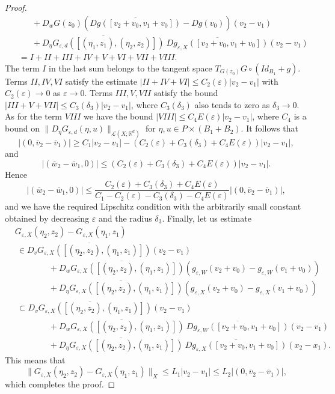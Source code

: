 \documentclass[10pt,a4paper]{amsart}
\def\R{\mathbb{R}}
\begin{document}
\begin{proof}
\begin{align*}
	 				& \qquad +D_wG(z_0)\left(\overline{Dg([v_2+v_0,v_1+v_0])}-Dg(v_0)\right)(v_2-v_1)\\
	 				& \qquad  + \overline{D_\eta G_{\varepsilon,d}([(\eta_1,z_1),(\eta_2,z_2)])}\ \overline{D g_{\varepsilon,X}([v_2+v_0,v_1+v_0])} (v_2-v_1) \\
	 				& \ \ = I + II+III+IV+V+VI+VII+VIII.
	 			\end{align*}
	 			The  term $I$ in the last sum belongs to the tangent space $T_{G(z_0)}G\circ(Id_{B_1}+g)$. Terms $II, IV, VI$ satisfy the estimate $|II+IV+VI|\leq C_2(\varepsilon)|v_2-v_1|$ with $C_2(\varepsilon)\to 0$ as $\varepsilon\to 0$. Terms $III,V,VII$ satisfy the bound $|III+V+VII|\leq C_3(\delta_3)|v_2-v_1|$, where $C_3(\delta_3)$ also tends to zero as $\delta_3\to 0$. As for the term $VIII$ we have the bound $|VIII|\leq C_4 E(\varepsilon)|v_2-v_1|$, where $C_4$ is a bound on $\|D_\eta G_{\varepsilon,d}(\eta,u)\|_{\mathcal{L}(X;\R^d)}$ for $\eta,u\in P\times (B_1+B_2)$.
	 			It follows that
	 			$$
	 			|(0,\overline{v}_2-\overline{v}_1) | \geq C_1 |v_2-v_1| - (C_2(\varepsilon)+C_3(\delta_3)+C_4E(\varepsilon))|v_2-v_1|,
	 			$$
	 			and
	 			$$
	 			|(\overline{w}_2-\overline{w}_1,0) | \leq  (C_2(\varepsilon)+C_3(\delta_3)+C_4E(\varepsilon))|v_2-v_1|.
	 			$$
 Hence
	 			$$
	 			|(\overline{w}_2-\overline{w}_1,0) | \leq  \frac{C_2(\varepsilon)+C_3(\delta_3)+C_4E(\varepsilon)}{C_1-C_2(\varepsilon)-C_3(\delta_3)-C_4E(\varepsilon)}|(0,\overline{v}_2-\overline{v}_1) |,
	 			$$
	 			and we have the required Lipschitz condition with the arbitrarily small constant obtained by decreasing $\varepsilon$ and the radius $\delta_3$.
	 			Finally, let us estimate
	 			\begin{align*}
	 				& G_{\varepsilon,X}(\eta_2,z_2) - G_{\varepsilon,X}(\eta_1,z_1) \\
	 				& \ \in
	 				\overline{D_v G_{\varepsilon,X} ([(\eta_2,z_2),(\eta_1,z_1)])}(v_2-v_1)\\
	 				& \qquad \qquad + \overline{D_w G_{\varepsilon,X} ([(\eta_2,z_2),(\eta_1,z_1)])}(g_{\varepsilon,W}(v_2+v_0)-g_{\varepsilon,W}(v_1+v_0)) \\
	 				& \qquad \qquad  + \overline{D_\eta G_{\varepsilon,X} ([(\eta_2,z_2),(\eta_1,z_1)])}(g_{\varepsilon,X}(v_2+v_0)-g_{\varepsilon,X}(v_1+v_0))\\
	 				& \ \subset 
	 								\overline{D_v G_{\varepsilon,X} ([(\eta_2,z_2),(\eta_1,z_1)])}(v_2-v_1)\\
	 								& \qquad \qquad + \overline{D_w G_{\varepsilon,X} ([(\eta_2,z_2),(\eta_1,z_1)])}\ \overline{D g_{\varepsilon,W}([v_2+v_0,v_1+v_0])}(v_2-v_1)\\
	 				& \qquad \qquad  + \overline{D_\eta G_{\varepsilon,X} ([(\eta_2,z_2),(\eta_1,z_1)])}\ \overline{D g_{\varepsilon,X}([v_2+v_0,v_1+v_0])}(x_2-x_1).
	 			\end{align*}
	 			This means that
	 			$$
	 			\|G_{\varepsilon,X}(\eta_2,z_2) - G_{\varepsilon,X}(\eta_1,z_1)\|_X \leq L_1|v_2-v_1| \leq  L_2|(0,\overline{v}_2-\overline{v}_1) |,
	 			$$
	 			which completes the proof.
	 			
	 			\end{proof}
\end{document}

